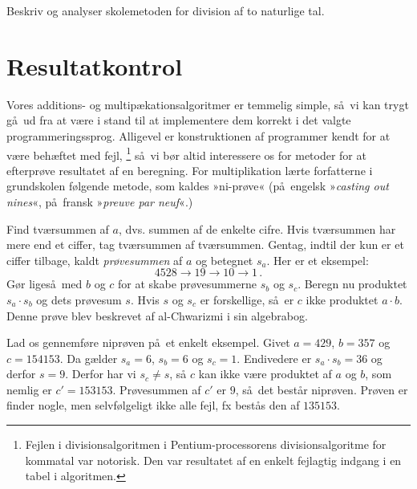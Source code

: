 \begin{exerc} 
  Beskriv og analyser skolemetoden for division
  af to naturlige tal. 
\end{exerc}

\section{Resultatkontrol}

Vores additions- og multipækationsalgoritmer er temmelig simple, så vi kan trygt gå ud fra at være i stand til at implementere dem korrekt i det valgte programmeringssprog.
Alligevel er konstruktionen af programmer kendt for at være behæftet med fejl,%
\footnote{Fejlen i divisionsalgoritmen i Pentium-processorens divisionsalgoritme for kommatal var notorisk.
Den var resultatet af en enkelt fejlagtig indgang i en tabel i algoritmen.
}
så vi bør altid interessere os for metoder for at efterprøve resultatet af en beregning.
For multiplikation lærte forfatterne i grundskolen følgende metode, som kaldes »ni-prøve«
(på engelsk »\emph{casting out nines}«,  på fransk »\emph{preuve par neuf}«.)

Find tværsummen af $a$, dvs. summen af de enkelte cifre.
Hvis tværsummen har mere end et ciffer, tag tværsummen af tværsummen.
Gentag, indtil der kun er et ciffer tilbage, kaldt \emph{prøvesummen}
 af $a$ og betegnet $s_a$.
Her er et eksempel:
\[ 4528 \rightarrow 19 \rightarrow 10 \rightarrow 1 \,.\]
Gør ligeså med $b$ og $c$ for at skabe prøvesummerne $s_b$ og $s_c$.
Beregn nu produktet $s_a \cdot s_b$ og dets prøvesum $s$.
Hvis $s$ og $s_c$ er forskellige, så er $c$ ikke produktet $a\cdot b$.
Denne prøve blev beskrevet af al-Chwarizmi i sin algebrabog.

Lad os gennemføre niprøven på et enkelt eksempel. 
Givet $a = 429$, $b = 357$ og $c = 154153$.
Da gælder $s_a = 6$, $s_b = 6$ og $s_c = 1$. 
Endivedere er $s_a \cdot s_b = 36$ og derfor $s = 9$.
Derfor har vi $s_c \not= s$, så $c$ kan ikke være produktet af $a$ og $b$, som nemlig er $c' = 153153$. 
Prøvesummen af $c'$ er $9$, så det består niprøven.
Prøven er finder nogle, men selvfølgeligt ikke alle fejl, fx bestås den af $135153$.


